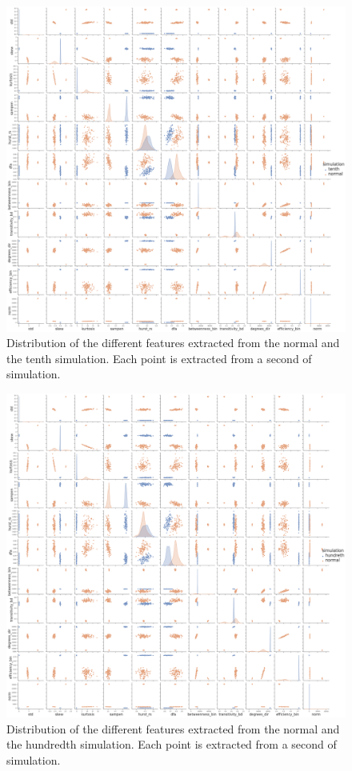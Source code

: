 \begin{figure}
  \centering
  \includegraphics[width=\textwidth]{normal-tenth-feature-distribution}
  \caption{Distribution of the different features extracted from the normal and the tenth simulation. Each point is extracted from a second of simulation.}
  \label{fig:normal-tenth-feature-distribution}
\end{figure}

\begin{figure}
  \centering
  \includegraphics[width=\textwidth]{normal-hundreth-feature-distribution}
  \caption{Distribution of the different features extracted from the normal and the hundredth simulation. Each point is extracted from a second of simulation.}
  \label{fig:normal-hundreth-feature-distribution}
\end{figure}

